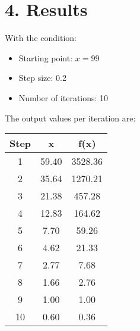 \documentclass{article}
\begin{document}
\section*{4. Results}

With the condition:
\begin{itemize}
    \item Starting point: \( x = 99 \)
    \item Step size: 0.2
    \item Number of iterations: 10
\end{itemize}

The output values per iteration are:

\begin{center}
\begin{tabular}{ccc}
\toprule
\textbf{Step} & \textbf{x} & \textbf{f(x)} \\
\midrule
1 & 59.40 & 3528.36 \\
2 & 35.64 & 1270.21 \\
3 & 21.38 & 457.28 \\
4 & 12.83 & 164.62 \\
5 & 7.70 & 59.26 \\
6 & 4.62 & 21.33 \\
7 & 2.77 & 7.68 \\
8 & 1.66 & 2.76 \\
9 & 1.00 & 1.00 \\
10 & 0.60 & 0.36 \\
\bottomrule
\end{tabular}
\end{center}
\end{document}
